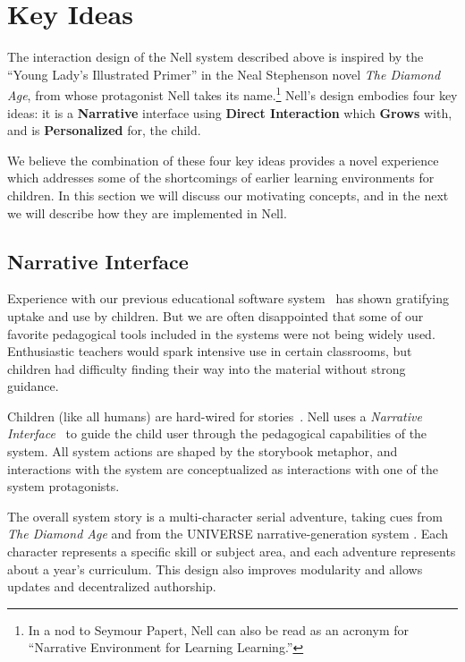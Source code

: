 \documentclass{acm_proc_article-sp}
\begin{document}
\section{Key Ideas}
The interaction design of the Nell system described above is inspired
by the ``Young Lady's Illustrated Primer'' in the Neal Stephenson
novel \textit{The Diamond Age}, from whose protagonist Nell takes its
name.\footnote{In a nod to Seymour Papert, Nell can also be read as an
acronym for ``Narrative Environment for Learning Learning.''}
Nell's design embodies four key ideas: it is a \textbf{Narrative}
interface using \textbf{Direct Interaction} which \textbf{Grows} with,
and is \textbf{Personalized} for, the child.

We believe the combination of these four key ideas provides a novel
experience which addresses some of the shortcomings of earlier
learning environments for children.  In this section we will discuss
our motivating concepts, and in the next we will describe how
they are implemented in Nell.


\subsection{Narrative Interface}

Experience with our previous educational software
system~\cite{flores:uruguay,idb:peru} has shown gratifying uptake and
use by children.  But we are often disappointed that some of our
favorite pedagogical tools included in the systems were not being
widely used.  Enthusiastic teachers would spark intensive use in
certain classrooms, but children had difficulty finding their way into
the material without strong guidance.

Children (like all humans) are hard-wired for
stories~\cite{boyd:stories}.  Nell uses a
\textit{Narrative Interface}~\cite{bizzocchi:narrative,don:narrative,laurel:computers} 
to guide the child user through the pedagogical capabilities of the
system.  All system actions are shaped by the storybook metaphor, and
interactions with the system are conceptualized as interactions with
one of the system protagonists.

The overall system story is a multi-character serial adventure, taking
cues from \textit{The Diamond Age} and
from the UNIVERSE narrative-generation system \cite{lebowitz:universe}.
Each character represents a specific skill or subject area, and each
adventure represents about a year's curriculum.  This design also
improves modularity and allows updates and decentralized authorship.
\end{document}
